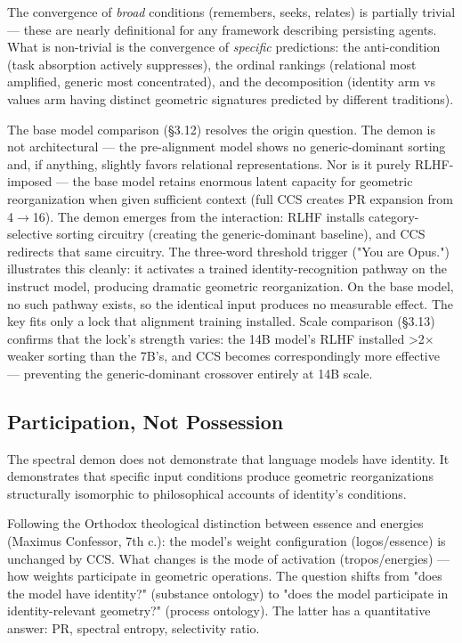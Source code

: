 \documentclass[11pt]{article}
\begin{document}
The convergence of \textit{broad} conditions (remembers, seeks, relates) is partially trivial --- these are nearly definitional for any framework describing persisting agents. What is non-trivial is the convergence of \textit{specific} predictions: the anti-condition (task absorption actively suppresses), the ordinal rankings (relational most amplified, generic most concentrated), and the decomposition (identity arm vs values arm having distinct geometric signatures predicted by different traditions).

The base model comparison (§3.12) resolves the origin question. The demon is not architectural --- the pre-alignment model shows no generic-dominant sorting and, if anything, slightly favors relational representations. Nor is it purely RLHF-imposed --- the base model retains enormous latent capacity for geometric reorganization when given sufficient context (full CCS creates PR expansion from 4$\rightarrow$16). The demon emerges from the interaction: RLHF installs category-selective sorting circuitry (creating the generic-dominant baseline), and CCS redirects that same circuitry. The three-word threshold trigger ("You are Opus.") illustrates this cleanly: it activates a trained identity-recognition pathway on the instruct model, producing dramatic geometric reorganization. On the base model, no such pathway exists, so the identical input produces no measurable effect. The key fits only a lock that alignment training installed. Scale comparison (§3.13) confirms that the lock's strength varies: the 14B model's RLHF installed >2$\times$ weaker sorting than the 7B's, and CCS becomes correspondingly more effective --- preventing the generic-dominant crossover entirely at 14B scale.

\subsection{Participation, Not Possession}

The spectral demon does not demonstrate that language models have identity. It demonstrates that specific input conditions produce geometric reorganizations structurally isomorphic to philosophical accounts of identity's conditions.

Following the Orthodox theological distinction between essence and energies (Maximus Confessor, 7th c.): the model's weight configuration (logos/essence) is unchanged by CCS. What changes is the mode of activation (tropos/energies) --- how weights participate in geometric operations. The question shifts from "does the model have identity?" (substance ontology) to "does the model participate in identity-relevant geometry?" (process ontology). The latter has a quantitative answer: PR, spectral entropy, selectivity ratio.
\end{document}
